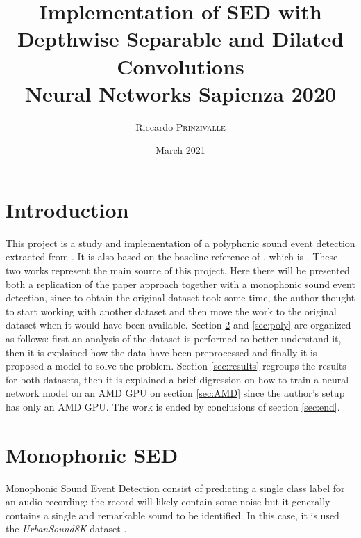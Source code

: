 \documentclass{article}
\title{Implementation of SED with Depthwise Separable and Dilated Convolutions \\[0.2em]\small{}Neural Networks Sapienza 2020} %
\author{Riccardo \textsc{Prinzivalle}} %
\date{March 2021} %
\begin{document}
\maketitle %



\section{Introduction}
\label{sec:intro}

This project is a study and implementation of a polyphonic sound event detection extracted from \cite{drossos2020sound}. It is also based on the baseline reference of \cite{drossos2020sound}, which is \cite{Cakir_2017}. These two works represent the main source of this project. Here there will be presented both a replication of the paper approach together with a monophonic sound event detection, since to obtain the original dataset took some time, the author thought to start working with another dataset and then move the work to the original dataset when it would have been available. Section \ref{sec:mono} and \ref{sec:poly} are organized as follows: first an analysis of the dataset is performed to better understand it, then it is explained how the data have been preprocessed and finally it is proposed a model to solve the problem. Section \ref{sec:results} regroups the results for both datasets, then it is explained a brief digression on how to train a neural network model on an AMD GPU on section \ref{sec:AMD} since the author's setup has only an AMD GPU. The work is ended by conclusions of section \ref{sec:end}.
 

\section{Monophonic SED}
\label{sec:mono}

Monophonic Sound Event Detection consist of predicting a single class label for an audio recording: the record will likely contain some noise but it generally contains a single and remarkable sound to be identified. In this case, it is used the \textit{UrbanSound8K} dataset \cite{Salamon:UrbanSound:ACMMM:14}.
\end{document}

